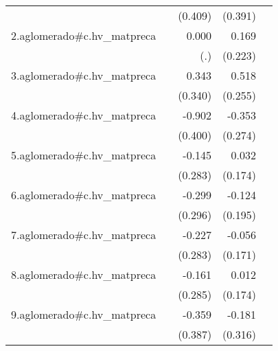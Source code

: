 {\begin{longtable}{l*{4}{D{.}{.}{-1}}}
            &                     &     (0.409)         &     (0.391)         &                     \\
\addlinespace
2.aglomerado#c.hv\_matpreca&                     &       0.000         &       0.169         &                     \\
            &                     &         (.)         &     (0.223)         &                     \\
\addlinespace
3.aglomerado#c.hv\_matpreca&                     &       0.343         &       0.518\sym{*}  &                     \\
            &                     &     (0.340)         &     (0.255)         &                     \\
\addlinespace
4.aglomerado#c.hv\_matpreca&                     &      -0.902\sym{*}  &      -0.353         &                     \\
            &                     &     (0.400)         &     (0.274)         &                     \\
\addlinespace
5.aglomerado#c.hv\_matpreca&                     &      -0.145         &       0.032         &                     \\
            &                     &     (0.283)         &     (0.174)         &                     \\
\addlinespace
6.aglomerado#c.hv\_matpreca&                     &      -0.299         &      -0.124         &                     \\
            &                     &     (0.296)         &     (0.195)         &                     \\
\addlinespace
7.aglomerado#c.hv\_matpreca&                     &      -0.227         &      -0.056         &                     \\
            &                     &     (0.283)         &     (0.171)         &                     \\
\addlinespace
8.aglomerado#c.hv\_matpreca&                     &      -0.161         &       0.012         &                     \\
            &                     &     (0.285)         &     (0.174)         &                     \\
\addlinespace
9.aglomerado#c.hv\_matpreca&                     &      -0.359         &      -0.181         &                     \\
            &                     &     (0.387)         &     (0.316)         &                     \\

\end{longtable}}
